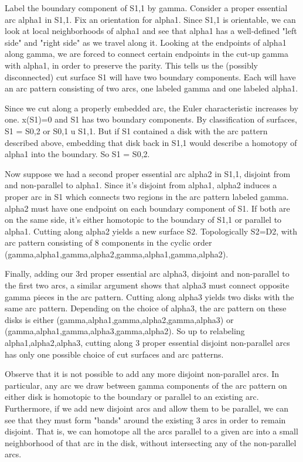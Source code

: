 \documentclass[12pt]{amsart}
\theoremstyle{definition}
\begin{document}
Label the boundary component of S1,1 by gamma. Consider a proper essential arc
alpha1 in S1,1. Fix an orientation for alpha1. Since S1,1 is orientable, we can
look at local neighborhoods of alpha1 and see that alpha1 has a well-defined
"left side" and "right side" as we travel along it. Looking at the endpoints of
alpha1 along gamma, we are forced to connect certain endpoints in the cut-up
gamma with alpha1, in order to preserve the parity. This tells us the (possibly
disconnected) cut surface S1 will have two boundary components. Each will have
an arc pattern consisting of two arcs, one labeled gamma and one labeled
alpha1.

Since we cut along a properly embedded arc, the Euler characteristic increases
by one. x(S1)=0 and S1 has two boundary components. By classification of
surfaces, S1 = S0,2 or S0,1 u S1,1. But if S1 contained a disk with the arc
pattern described above, embedding that disk back in S1,1 would describe
a homotopy of alpha1 into the boundary. So S1 = S0,2.

Now suppose we had a second proper essential arc alpha2 in S1,1, disjoint from
and non-parallel to alpha1. Since it's disjoint from alpha1, alpha2 induces
a proper arc in S1 which connects two regions in the arc pattern labeled gamma.
alpha2 must have one endpoint on each boundary component of S1. If both are on
the same side, it's either homotopic to the boundary of S1,1 or parallel to
alpha1. Cutting along alpha2 yields a new surface S2. Topologically S2=D2, with
arc pattern consisting of 8 components in the cyclic order
(gamma,alpha1,gamma,alpha2,gamma,alpha1,gamma,alpha2).

Finally, adding our 3rd proper essential arc alpha3, disjoint and non-parallel
to the first two arcs, a similar argument shows that alpha3 must connect
opposite gamma pieces in the arc pattern. Cutting along alpha3 yields two disks
with the same arc pattern. Depending on the choice of alpha3, the arc pattern
on these disks is either (gamma,alpha1,gamma,alpha2,gamma,alpha3) or
(gamma,alpha1,gamma,alpha3,gamma,alpha2). So up to relabeling
alpha1,alpha2,alpha3, cutting along 3 proper essential disjoint non-parallel
arcs has only one possible choice of cut surfaces and arc patterns.

Observe that it is not possible to add any more disjoint non-parallel arcs. In
particular, any arc we draw between gamma components of the arc pattern on
either disk is homotopic to the boundary or parallel to an existing arc.
Furthermore, if we add new disjoint arcs and allow them to be parallel, we can
see that they must form "bands" around the existing 3 arcs in order to remain
disjoint. That is, we can homotope all the arcs parallel to a given arc into
a small neighborhood of that arc in the disk, without intersecting any of the
non-parallel arcs.
\end{document}
